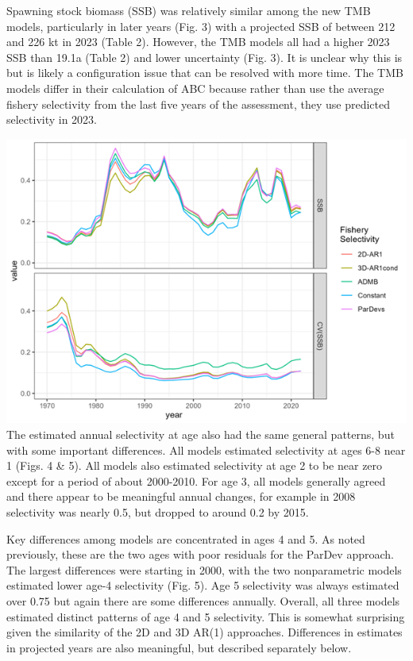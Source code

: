 \documentclass[
]{article}
\begin{document}
Spawning stock biomass (SSB) was relatively similar among the new TMB
models, particularly in later years (Fig. 3) with a projected SSB of
between 212 and 226 kt in 2023 (Table 2). However, the TMB models all
had a higher 2023 SSB than 19.1a (Table 2) and lower uncertainty (Fig.
3). It is unclear why this is but is likely a configuration issue that
can be resolved with more time. The TMB models differ in their
calculation of ABC because rather than use the average fishery
selectivity from the last five years of the assessment, they use
predicted selectivity in 2023.

\includegraphics{Results/Figure3_ssb_timeseries.png} The estimated
annual selectivity at age also had the same general patterns, but with
some important differences. All models estimated selectivity at ages 6-8
near 1 (Figs. 4 \& 5). All models also estimated selectivity at age 2 to
be near zero except for a period of about 2000-2010. For age 3, all
models generally agreed and there appear to be meaningful annual
changes, for example in 2008 selectivity was nearly 0.5, but dropped to
around 0.2 by 2015.

Key differences among models are concentrated in ages 4 and 5. As noted
previously, these are the two ages with poor residuals for the ParDev
approach. The largest differences were starting in 2000, with the two
nonparametric models estimated lower age-4 selectivity (Fig. 5). Age 5
selectivity was always estimated over 0.75 but again there are some
differences annually. Overall, all three models estimated distinct
patterns of age 4 and 5 selectivity. This is somewhat surprising given
the similarity of the 2D and 3D AR(1) approaches. Differences in
estimates in projected years are also meaningful, but described
separately below.
\end{document}
